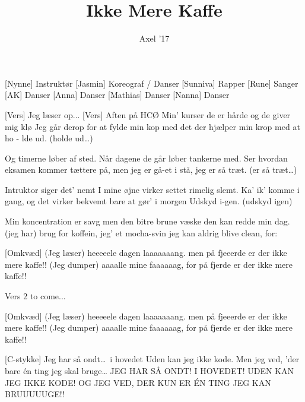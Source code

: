 \documentclass[a4paper,11pt]{article}
\title{Ikke Mere Kaffe}
\author{Axel '17}
\begin{document}
\maketitle

\begin{roles}
[Nynne] Instruktør
[Jasmin] Koreograf / Danser
[Sunniva] Rapper
[Rune] Sanger
[AK] Danser
[Anna] Danser
[Mathias] Danser
[Nanna] Danser
\end{roles}

\begin{song}
[Vers]
Jeg læser op...
[Vers]
Aften på HCØ
Min' kurser de er hårde og de giver mig klø
Jeg går derop for at fylde min kop
med det der hjælper min krop
med at ho - lde ud. (holde ud\ldots)

Og timerne løber af sted.
Når dagene de går løber tankerne med.
Ser hvordan eksamen kommer tættere på,
men jeg er gå-et i stå,
jeg er så træt. (er så træt\ldots)

Intruktor siger det' nemt
I mine øjne virker settet rimelig slemt.
Ka' ik' komme i gang, og det virker bekvemt
bare at gør' i morgen
Udskyd i-gen. (udskyd igen)

Min koncentration er savg
men den bitre brune væske den kan redde min dag.
(jeg har) brug for koffein,
jeg' et mocha-svin
jeg kan aldrig blive clean, for: \clearpage

[Omkvæd]
(Jeg læser) heeeeele dagen laaaaaaang.
men på fjeeerde
er der ikke mere kaffe!!
(Jeg dumper) aaaalle mine faaaaaag,
for på fjerde
er der ikke mere kaffe!!

Vers 2 to come...

[Omkvæd]
(Jeg læser) heeeeele dagen laaaaaaang.
men på fjeeerde
er der ikke mere kaffe!!
(Jeg dumper) aaaalle mine faaaaaag,
for på fjerde
er der ikke mere kaffe!!

[C-stykke]
Jeg har så ondt\ldots\ i hovedet
Uden kan jeg ikke kode.
Men jeg ved,
'der bare én ting jeg skal bruge\ldots
JEG HAR SÅ ONDT! I HOVEDET!
UDEN KAN JEG IKKE KODE!
OG JEG VED,
DER KUN ER ÉN TING JEG KAN BRUUUUUGE!!
\end{song}
\end{document}
